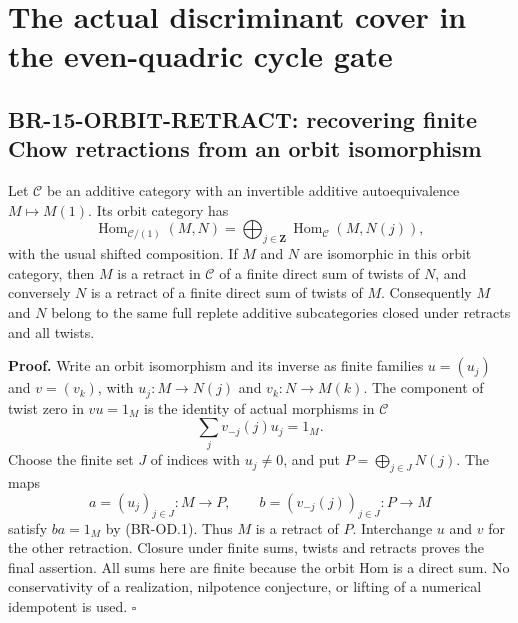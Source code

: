 \section{The actual discriminant cover in the even-quadric cycle gate}

\subsection{BR-15-ORBIT-RETRACT: recovering finite Chow retractions from an orbit isomorphism}
Let $\mathcal C$ be an additive category with an invertible additive
autoequivalence $M\mapsto M(1)$. Its orbit category has
\[
 \operatorname{Hom}_{\mathcal C/(1)}(M,N)
 =\bigoplus_{j\in\mathbf Z}\operatorname{Hom}_{\mathcal C}(M,N(j)),
\]
with the usual shifted composition. If $M$ and $N$ are isomorphic in
this orbit category, then $M$ is a retract in $\mathcal C$ of a finite
direct sum of twists of $N$, and conversely $N$ is a retract of a finite
direct sum of twists of $M$. Consequently $M$ and $N$ belong to the same
full replete additive subcategories closed under retracts and all twists.

\textbf{Proof.} Write an orbit isomorphism and its inverse as finite
families $u=(u_j)$ and $v=(v_k)$, with
$u_j:M\to N(j)$ and $v_k:N\to M(k)$. The component of twist zero in
$vu=1_M$ is the identity of actual morphisms in $\mathcal C$
\[
 \sum_j v_{-j}(j)u_j=1_M. \tag{BR-OD.1}
\]
Choose the finite set $J$ of indices with $u_j\ne0$, and put
$P=\bigoplus_{j\in J}N(j)$. The maps
\[
 a=(u_j)_{j\in J}:M\longrightarrow P,\qquad
 b=(v_{-j}(j))_{j\in J}:P\longrightarrow M
\]
satisfy $ba=1_M$ by (BR-OD.1). Thus $M$ is a retract of $P$. Interchange
$u$ and $v$ for the other retraction. Closure under finite sums, twists
and retracts proves the final assertion. All sums here are finite
because the orbit Hom is a direct sum. No conservativity of a realization,
nilpotence conjecture, or lifting of a numerical idempotent is used.
$\square$

